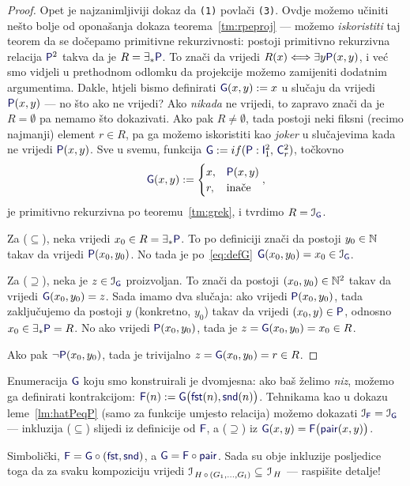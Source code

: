 \begin{proof}
Opet je najzanimljiviji dokaz da \texttt{(1)} povlači \texttt{(3)}. %
Ovdje možemo učiniti nešto bolje od oponašanja dokaza teorema~\ref{tm:rpeproj} --- možemo \emph{iskoristiti} taj teorem da se dočepamo primitivne rekurzivnosti: postoji primitivno rekurzivna relacija $\f P^2$ takva da je $R=\exists_*\f P$. To znači da vrijedi $R(x)\Longleftrightarrow\exists y\f P(x,y)$, i već smo vidjeli u prethodnom odlomku da projekcije možemo zamijeniti dodatnim argumentima. Dakle, htjeli bismo definirati $\f G(x,y):=x$ u slučaju da vrijedi $\f P(x,y)$ --- no što ako ne vrijedi? Ako \emph{nikada} ne vrijedi, to zapravo znači da je $R=\emptyset$ pa nemamo što dokazivati. Ako pak $R\ne\emptyset$, tada postoji neki fiksni (recimo najmanji) element $r\in R$, pa ga možemo iskoristiti kao \emph{joker} u slučajevima kada ne vrijedi $\f P(x,y)$. Sve u svemu, funkcija $\f G:=\IF{\f P:\f I_1^2,\,\f C_r^2}$, točkovno
\begin{equation}\label{eq:defG}
    \f G(x,y):=\begin{cases}
        x,&\f P(x,y)\\
        r,&\text{inače}
    \end{cases}\text,
\end{equation}
je primitivno rekurzivna po teoremu~\ref{tm:grek}, i tvrdimo $R=\im{\f G}$.

Za ($\subseteq$), neka vrijedi $x_0\in R=\exists_*\f P$. To po definiciji znači da postoji $y_0\in{\mathbb N}$ takav da vrijedi $\f P(x_0,y_0)$. No tada je po~\eqref{eq:defG} $\f G(x_0,y_0)=x_0\in\im{\f G}$.

Za ($\supseteq$), neka je $z\in\im{\f G}$ proizvoljan. To znači da postoji $(x_0,y_0)\in{\mathbb N}^2$ takav da vrijedi $\f G(x_0,y_0)=z$. Sada imamo dva slučaja: ako vrijedi $\f P(x_0,y_0)$, tada zaključujemo da postoji $y$ (konkretno, $y_0$) takav da vrijedi $(x_0,y)\in\f P$, odnosno $x_0\in\exists_*\f P=R$. No ako vrijedi $\f P(x_0,y_0)$, tada je $z=\f G(x_0,y_0)=x_0\in R$.

Ako pak $\lnot\f P(x_0,y_0)$, tada je trivijalno $z=\f G(x_0,y_0)=r\in R$.
\end{proof}

\begin{napomena}[{name=[enumeracija kao jednomjesna funkcija --- niz]}]
Enumeracija $\f G$ koju smo konstruirali je dvomjesna: ako baš želimo \emph{niz}, možemo ga definirati kontrakcijom: $\f F(n):=\f G\bigl(\f{fst}(n),\f{snd}(n)\bigr)$. Tehnikama kao u dokazu leme~\ref{lm:hatPeqP} (samo za funkcije umjesto relacija) možemo dokazati $\im{\f F}=\im{\f G}$ --- inkluzija ($\subseteq$) slijedi iz definicije od $\f F$, a ($\supseteq$) iz $\f G(x,y)=\f F\bigl(\f{pair}(x,y)\bigr)$.

Simbolički, $\f F=\f G\circ(\f{fst},\f{snd})$, a $\f G=\f F\circ\f{pair}$. Sada su obje inkluzije posljedice toga da za svaku kompoziciju vrijedi $\mathcal I_{\,H\,\circ\,(G_1,\dotsc,G_l)}\subseteq\mspace{2mu}\mathcal I_{\,H}$ --- raspišite detalje!
\end{napomena}

